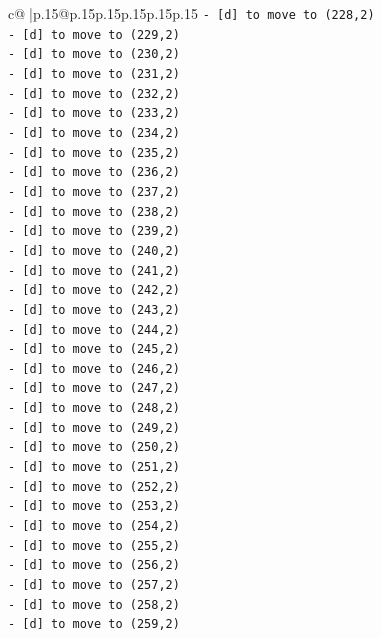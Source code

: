 \documentclass{article}
\begin{document}
{\begin{supertabular}{c@{$\;$}|p{.15\linewidth}@{}p{.15\linewidth}p{.15\linewidth}p{.15\linewidth}p{.15\linewidth}p{.15\linewidth}}
{{{\texttt{{-} {[}d{]} to move to (228,2)} \\
\texttt{{-} {[}d{]} to move to (229,2)} \\
\texttt{{-} {[}d{]} to move to (230,2)} \\
\texttt{{-} {[}d{]} to move to (231,2)} \\
\texttt{{-} {[}d{]} to move to (232,2)} \\
\texttt{{-} {[}d{]} to move to (233,2)} \\
\texttt{{-} {[}d{]} to move to (234,2)} \\
\texttt{{-} {[}d{]} to move to (235,2)} \\
\texttt{{-} {[}d{]} to move to (236,2)} \\
\texttt{{-} {[}d{]} to move to (237,2)} \\
\texttt{{-} {[}d{]} to move to (238,2)} \\
\texttt{{-} {[}d{]} to move to (239,2)} \\
\texttt{{-} {[}d{]} to move to (240,2)} \\
\texttt{{-} {[}d{]} to move to (241,2)} \\
\texttt{{-} {[}d{]} to move to (242,2)} \\
\texttt{{-} {[}d{]} to move to (243,2)} \\
\texttt{{-} {[}d{]} to move to (244,2)} \\
\texttt{{-} {[}d{]} to move to (245,2)} \\
\texttt{{-} {[}d{]} to move to (246,2)} \\
\texttt{{-} {[}d{]} to move to (247,2)} \\
\texttt{{-} {[}d{]} to move to (248,2)} \\
\texttt{{-} {[}d{]} to move to (249,2)} \\
\texttt{{-} {[}d{]} to move to (250,2)} \\
\texttt{{-} {[}d{]} to move to (251,2)} \\
\texttt{{-} {[}d{]} to move to (252,2)} \\
\texttt{{-} {[}d{]} to move to (253,2)} \\
\texttt{{-} {[}d{]} to move to (254,2)} \\
\texttt{{-} {[}d{]} to move to (255,2)} \\
\texttt{{-} {[}d{]} to move to (256,2)} \\
\texttt{{-} {[}d{]} to move to (257,2)} \\
\texttt{{-} {[}d{]} to move to (258,2)} \\
\texttt{{-} {[}d{]} to move to (259,2)} \\
}}}
\end{supertabular}}
\end{document}
